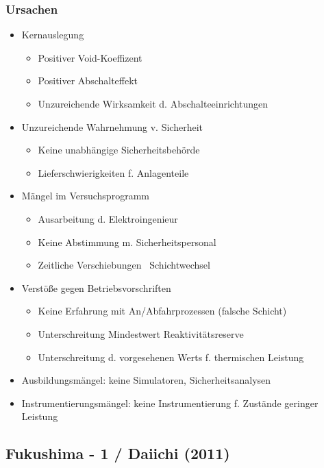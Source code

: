 \documentclass[12pt]{article}
\begin{document}
\subsubsection{Ursachen}
\begin{itemize}
  \item Kernauslegung
  \begin{itemize}
    \item Positiver Void-Koeffizent
    \item Positiver Abschalteffekt
    \item Unzureichende Wirksamkeit d. Abschalteeinrichtungen
  \end{itemize}
  \item Unzureichende Wahrnehmung v. Sicherheit
  \begin{itemize}
    \item Keine unabhängige Sicherheitsbehörde
    \item Lieferschwierigkeiten f. Anlagenteile
  \end{itemize}
  \item Mängel im Versuchsprogramm
  \begin{itemize}
    \item Ausarbeitung d. Elektroingenieur
    \item Keine Abstimmung m. Sicherheitspersonal
    \item Zeitliche Verschiebungen \textrightarrow\ Schichtwechsel
  \end{itemize}
  \item Verstöße gegen Betriebsvorschriften
  \begin{itemize}
    \item Keine Erfahrung mit An/Abfahrprozessen (falsche Schicht)
    \item Unterschreitung Mindestwert Reaktivitätsreserve
    \item Unterschreitung d. vorgesehenen Werts f. thermischen Leistung 
  \end{itemize}
  \item Ausbildungsmängel: keine Simulatoren, Sicherheitsanalysen
  \item Instrumentierungsmängel: keine Instrumentierung f. Zustände geringer Leistung
\end{itemize}

\subsection{Fukushima - 1 / Daiichi (2011)}
\end{document}
